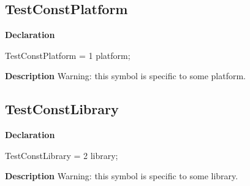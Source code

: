 \documentclass{report}
\newif\ifpdf
\begin{document}
\subsection*{TestConstPlatform}
\fi
\label{ok_hint_directives-TestConstPlatform}
\begin{list}{}{
\setlength{\itemindent}{0cm}
\setlength{\listparindent}{0cm}
\setlength{\leftmargin}{\evensidemargin}
\addtolength{\leftmargin}{\tmplength}
\settowidth{\labelsep}{X}
\addtolength{\leftmargin}{\labelsep}
\setlength{\labelwidth}{\tmplength}
}
\item[\textbf{Declaration}\hfill]
\ifpdf
\begin{flushleft}
\fi
\begin{ttfamily}
TestConstPlatform = 1 platform;\end{ttfamily}

\ifpdf
\end{flushleft}
\fi

\par
\item[\textbf{Description}]
Warning: this symbol is specific to some platform.

 

\end{list}
\ifpdf
\subsection*{\large{\textbf{TestConstLibrary}}\normalsize\hspace{1ex}\hrulefill}
\else
\subsection*{TestConstLibrary}
\fi
\label{ok_hint_directives-TestConstLibrary}
\begin{list}{}{
\setlength{\itemindent}{0cm}
\setlength{\listparindent}{0cm}
\setlength{\leftmargin}{\evensidemargin}
\addtolength{\leftmargin}{\tmplength}
\settowidth{\labelsep}{X}
\addtolength{\leftmargin}{\labelsep}
\setlength{\labelwidth}{\tmplength}
}
\item[\textbf{Declaration}\hfill]
\ifpdf
\begin{flushleft}
\fi
\begin{ttfamily}
TestConstLibrary = 2 library;\end{ttfamily}

\ifpdf
\end{flushleft}
\fi

\par
\item[\textbf{Description}]
Warning: this symbol is specific to some library.

 

\end{list}
\ifpdf
\end{document}
